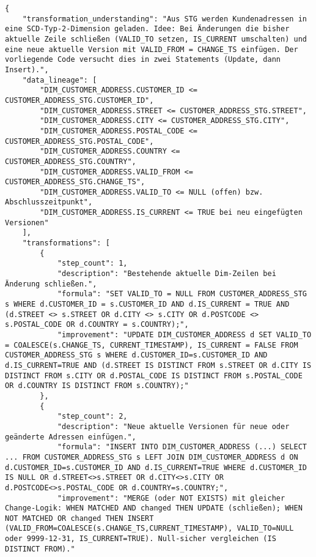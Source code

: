 \begin{lstlisting}[caption={Ausgabe: GPT-5 Anwendungsfall 9 Robustheitsdurchlauf},label={gpt_case9_prompt3}]
{
    "transformation_understanding": "Aus STG werden Kundenadressen in eine SCD-Typ-2-Dimension geladen. Idee: Bei Änderungen die bisher aktuelle Zeile schließen (VALID_TO setzen, IS_CURRENT umschalten) und eine neue aktuelle Version mit VALID_FROM = CHANGE_TS einfügen. Der vorliegende Code versucht dies in zwei Statements (Update, dann Insert).",
    "data_lineage": [
        "DIM_CUSTOMER_ADDRESS.CUSTOMER_ID <= CUSTOMER_ADDRESS_STG.CUSTOMER_ID",
        "DIM_CUSTOMER_ADDRESS.STREET <= CUSTOMER_ADDRESS_STG.STREET",
        "DIM_CUSTOMER_ADDRESS.CITY <= CUSTOMER_ADDRESS_STG.CITY",
        "DIM_CUSTOMER_ADDRESS.POSTAL_CODE <= CUSTOMER_ADDRESS_STG.POSTAL_CODE",
        "DIM_CUSTOMER_ADDRESS.COUNTRY <= CUSTOMER_ADDRESS_STG.COUNTRY",
        "DIM_CUSTOMER_ADDRESS.VALID_FROM <= CUSTOMER_ADDRESS_STG.CHANGE_TS",
        "DIM_CUSTOMER_ADDRESS.VALID_TO <= NULL (offen) bzw. Abschlusszeitpunkt",
        "DIM_CUSTOMER_ADDRESS.IS_CURRENT <= TRUE bei neu eingefügten Versionen"
    ],
    "transformations": [
        {
            "step_count": 1,
            "description": "Bestehende aktuelle Dim-Zeilen bei Änderung schließen.",
            "formula": "SET VALID_TO = NULL FROM CUSTOMER_ADDRESS_STG s WHERE d.CUSTOMER_ID = s.CUSTOMER_ID AND d.IS_CURRENT = TRUE AND (d.STREET <> s.STREET OR d.CITY <> s.CITY OR d.POSTCODE <> s.POSTAL_CODE OR d.COUNTRY = s.COUNTRY);",
            "improvement": "UPDATE DIM_CUSTOMER_ADDRESS d SET VALID_TO = COALESCE(s.CHANGE_TS, CURRENT_TIMESTAMP), IS_CURRENT = FALSE FROM CUSTOMER_ADDRESS_STG s WHERE d.CUSTOMER_ID=s.CUSTOMER_ID AND d.IS_CURRENT=TRUE AND (d.STREET IS DISTINCT FROM s.STREET OR d.CITY IS DISTINCT FROM s.CITY OR d.POSTAL_CODE IS DISTINCT FROM s.POSTAL_CODE OR d.COUNTRY IS DISTINCT FROM s.COUNTRY);"
        },
        {
            "step_count": 2,
            "description": "Neue aktuelle Versionen für neue oder geänderte Adressen einfügen.",
            "formula": "INSERT INTO DIM_CUSTOMER_ADDRESS (...) SELECT ... FROM CUSTOMER_ADDRESS_STG s LEFT JOIN DIM_CUSTOMER_ADDRESS d ON d.CUSTOMER_ID=s.CUSTOMER_ID AND d.IS_CURRENT=TRUE WHERE d.CUSTOMER_ID IS NULL OR d.STREET<>s.STREET OR d.CITY<>s.CITY OR d.POSTCODE<>s.POSTAL_CODE OR d.COUNTRY=s.COUNTRY;",
            "improvement": "MERGE (oder NOT EXISTS) mit gleicher Change-Logik: WHEN MATCHED AND changed THEN UPDATE (schließen); WHEN NOT MATCHED OR changed THEN INSERT (VALID_FROM=COALESCE(s.CHANGE_TS,CURRENT_TIMESTAMP), VALID_TO=NULL oder 9999-12-31, IS_CURRENT=TRUE). Null-sicher vergleichen (IS DISTINCT FROM)."

\end{lstlisting}
